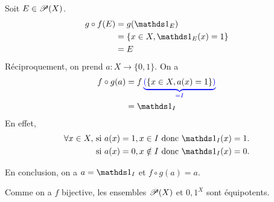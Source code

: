 {\begin{td-sol}[]
\begin{enumerate}
            Soit \(E\in\mathscr{P}(X)\).
            \begin{equation*}
                \begin{aligned}
                    g\circ f(E)
                    &=g(\one_E)\\
                    &=\left\{x\in X,\one_E(x)=1\right\}\\
                    &= E
                \end{aligned}
            \end{equation*}
            Réciproquement, on prend \(a\colon X\to\{0,1\}\). On a
            \begin{equation*}
                \begin{aligned}
                    f\circ g(a)
                    &= f
                        \color{blue}
                        \underbrace{\left(\color{black}\left\{x\in X,a(x)=1\right\}\color{blue}\right)\color{black}}
                        _{\color{blue}=I}
                        \color{black}
                        \\
                    &= \one_I
                \end{aligned}
            \end{equation*}
            En effet,
            \begin{equation*}
                \begin{aligned}
                    \forall x\in X, 
                    &\text{ si } a(x)=1,x\in I \text{ donc } \one_I(x)=1.\\
                    &\text{ si } a(x)=0,x\notin I \text{ donc } \one_I(x)=0.
                \end{aligned}
            \end{equation*}

            En conclusion, on a \(a=\one_I\) et  \(f\circ g(a)=a\).

            Comme on a \(f\) bijective, les ensembles \(\mathscr{P}(X)\) et \({0,1}^X\) sont équipotents.
        \end{enumerate}
    \end{td-sol}
}{}

